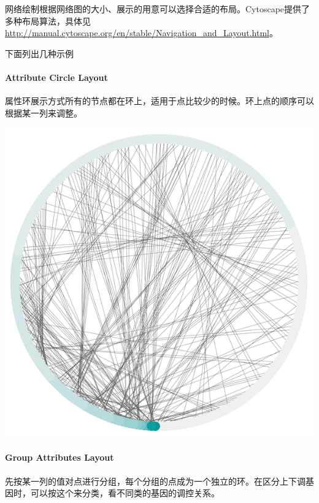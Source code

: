 \documentclass[]{article}
\numberwithin{figure}{section}
\numberwithin{table}{section}
\theoremstyle{definition}
\theoremstyle{definition}
\theoremstyle{definition}
\theoremstyle{remark}
\begin{document}
网络绘制根据网络图的大小、展示的用意可以选择合适的布局。Cytoscape提供了多种布局算法，具体见\url{http://manual.cytoscape.org/en/stable/Navigation_and_Layout.html}。

下面列出几种示例

\paragraph{Attribute Circle Layout}\label{attribute-circle-layout}

属性环展示方式所有的节点都在环上，适用于点比较少的时候。环上点的顺序可以根据某一列来调整。

\begin{center}\includegraphics[width=0.95\linewidth,height=0.7\textheight,keepaspectratio]{images/attribute_circle_layout} \end{center}

\paragraph{Group Attributes Layout}\label{group-attributes-layout}

先按某一列的值对点进行分组，每个分组的点成为一个独立的环。在区分上下调基因时，可以按这个来分类，看不同类的基因的调控关系。
\end{document}
